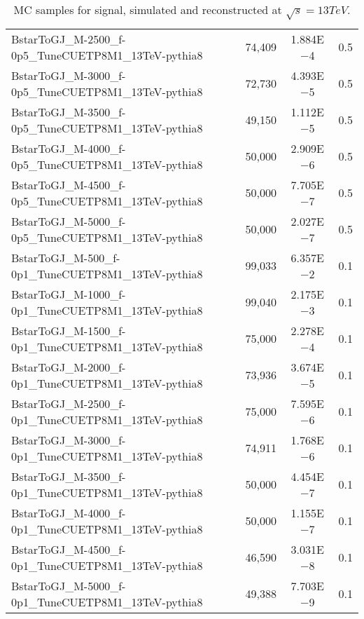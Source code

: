 \begin{table}[htbp]
\begin{center}
{\begin{tabular}{lccc}
        BstarToGJ\_M-2500\_f-0p5\_TuneCUETP8M1\_13TeV-pythia8  &  74,409  & 1.884E$-$4 & 0.5 \\
        BstarToGJ\_M-3000\_f-0p5\_TuneCUETP8M1\_13TeV-pythia8  &  72,730  & 4.393E$-$5 & 0.5 \\
        BstarToGJ\_M-3500\_f-0p5\_TuneCUETP8M1\_13TeV-pythia8  &  49,150  & 1.112E$-$5 & 0.5 \\        
        BstarToGJ\_M-4000\_f-0p5\_TuneCUETP8M1\_13TeV-pythia8  &  50,000  & 2.909E$-$6 & 0.5 \\        
        BstarToGJ\_M-4500\_f-0p5\_TuneCUETP8M1\_13TeV-pythia8  &  50,000  & 7.705E$-$7 & 0.5 \\        
        BstarToGJ\_M-5000\_f-0p5\_TuneCUETP8M1\_13TeV-pythia8  &  50,000  & 2.027E$-$7 & 0.5 \\
        \midrule
        \midrule
        BstarToGJ\_M-500\_f-0p1\_TuneCUETP8M1\_13TeV-pythia8   &  99,033 & 6.357E$-$2 & 0.1 \\        
        BstarToGJ\_M-1000\_f-0p1\_TuneCUETP8M1\_13TeV-pythia8  &  99,040 & 2.175E$-$3 & 0.1 \\       
        BstarToGJ\_M-1500\_f-0p1\_TuneCUETP8M1\_13TeV-pythia8  &  75,000 & 2.278E$-$4 & 0.1 \\        
        BstarToGJ\_M-2000\_f-0p1\_TuneCUETP8M1\_13TeV-pythia8  &  73,936 & 3.674E$-$5 & 0.1 \\        
        BstarToGJ\_M-2500\_f-0p1\_TuneCUETP8M1\_13TeV-pythia8  &  75,000 & 7.595E$-$6 & 0.1 \\        
        BstarToGJ\_M-3000\_f-0p1\_TuneCUETP8M1\_13TeV-pythia8  &  74,911 & 1.768E$-$6 & 0.1 \\
        BstarToGJ\_M-3500\_f-0p1\_TuneCUETP8M1\_13TeV-pythia8  &  50,000 & 4.454E$-$7 & 0.1 \\
        BstarToGJ\_M-4000\_f-0p1\_TuneCUETP8M1\_13TeV-pythia8  &  50,000 & 1.155E$-$7 & 0.1 \\        
        BstarToGJ\_M-4500\_f-0p1\_TuneCUETP8M1\_13TeV-pythia8  &  46,590 & 3.031E$-$8 & 0.1 \\        
        BstarToGJ\_M-5000\_f-0p1\_TuneCUETP8M1\_13TeV-pythia8  &  49,388 & 7.703E$-$9 & 0.1 \\
        \bottomrule
      \end{tabular}
    }
    \caption{MC samples for \bstar signal, simulated and reconstructed at $\sqrt{s}=13\unit{TeV}$.}
    \label{Table:BstarSigSamples}
  \end{center}
\end{table}


